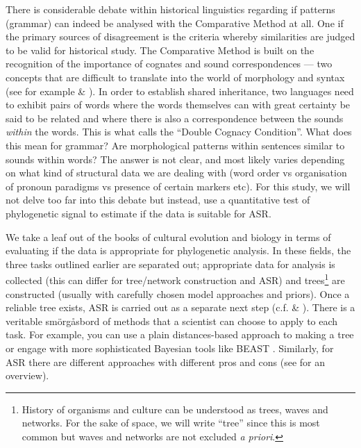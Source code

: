 \documentclass[12pt,letterpaper]{article}
\begin{document}
There is considerable debate within historical linguistics regarding if patterns (grammar) can indeed be analysed with the Comparative Method at all. One if the primary sources of disagreement is the criteria whereby similarities are judged to be valid for historical study. The Comparative Method is built on the recognition of the importance of cognates and sound correspondences --- two concepts that are difficult to translate into the world of morphology and syntax (see for example \citet{harris2008reconstruction} \& \citet{walkden_2013}). In order to establish shared inheritance, two languages need to exhibit pairs of words where the words themselves can with great certainty be said to be related and where there is also a correspondence between the sounds \emph{within} the words. This is what \citet{walkden_2013} calls the ``Double Cognacy Condition''. What does this mean for grammar? Are morphological patterns within sentences similar to sounds within words? The answer is not clear, and most likely varies depending on what kind of structural data we are dealing with (word order vs organisation of pronoun paradigms vs presence of certain markers etc). For this study, we will not delve too far into this debate but instead, use a quantitative test of phylogenetic signal to estimate if the data is suitable for ASR.


We take a leaf out of the books of cultural evolution and biology in terms of evaluating if the data is appropriate for phylogenetic analysis. In these fields, the three tasks outlined earlier are separated out; appropriate data for analysis is collected (this can differ for tree/network construction and ASR) and trees\footnote{History of organisms and culture can be understood as trees, waves and networks. For the sake of space, we will write ``tree'' since this is most common but waves and networks are not excluded \emph{a priori}.} are constructed (usually with carefully chosen model approaches and priors). Once a reliable tree exists, ASR is carried out as a separate next step (c.f. \citet{holland2020accuracy} \& \citet{evans2021uses}). There is a veritable smörgåsbord of methods that a scientist can choose to apply to each task. For example, you can use a plain distances-based approach to making a tree \citep{jager2016inferring} or engage with more sophisticated Bayesian tools like BEAST \citep{drummond2015bayesian}. Similarly, for ASR there are different approaches with different pros and cons (see \cite{joy2016ancestral} for an overview). 
\end{document}

